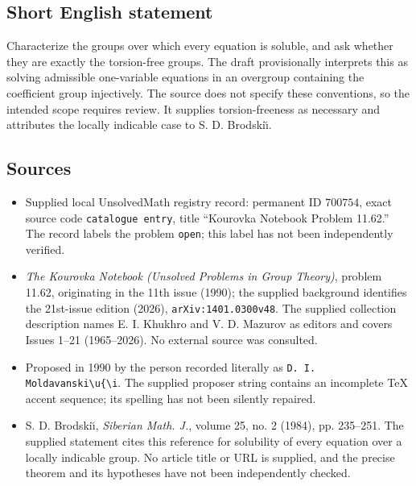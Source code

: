 \documentclass[11pt]{article}
\begin{document}
\subsection{Short English statement}
Characterize the groups over which every equation is soluble, and ask whether they are exactly the torsion-free groups. The draft provisionally interprets this as solving admissible one-variable equations in an overgroup containing the coefficient group injectively. The source does not specify these conventions, so the intended scope requires review. It supplies torsion-freeness as necessary and attributes the locally indicable case to S. D. Brodski\u{\i}.
\subsection{Sources}
\begin{itemize}
\item Supplied local UnsolvedMath registry record: permanent ID \(700754\), exact source code \texttt{catalogue entry}, title ``Kourovka Notebook Problem 11.62.'' The record labels the problem \texttt{open}; this label has not been independently verified.
\item \emph{The Kourovka Notebook (Unsolved Problems in Group Theory)}, problem 11.62, originating in the 11th issue (1990); the supplied background identifies the 21st-issue edition (2026), \texttt{arXiv:1401.0300v48}. The supplied collection description names E. I. Khukhro and V. D. Mazurov as editors and covers Issues 1--21 (1965--2026). No external source was consulted.
\item Proposed in 1990 by the person recorded literally as \texttt{D. I. Moldavanski\textbackslash{}u\{\textbackslash{}i}. The supplied proposer string contains an incomplete TeX accent sequence; its spelling has not been silently repaired.
\item S. D. Brodski\u{\i}, \emph{Siberian Math. J.}, volume 25, no. 2 (1984), pp. 235--251. The supplied statement cites this reference for solubility of every equation over a locally indicable group. No article title or URL is supplied, and the precise theorem and its hypotheses have not been independently checked.
\end{itemize}
\end{document}
